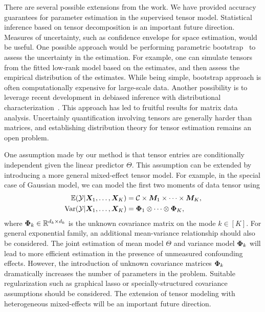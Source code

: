 \documentclass[12pt]{article}
\theoremstyle{definition}
\theoremstyle{definition}
\begin{document}
There are several possible extensions from the work. We have provided accuracy guarantees for parameter estimation in the supervised tensor model. Statistical inference based on tensor decomposition is an important future direction. Measures of uncertainty, such as confidence envelope for space estimation, would be useful. One possible approach would be performing parametric bootstrap~\citep{tibshirani1993introduction} to assess the uncertainty in the estimation. 
For example, one can simulate tensors from the fitted low-rank model based on the estimates, and then assess the empirical distribution of the estimates. 
While being simple, bootstrap approach is often computationally expensive for large-scale data. Another possibility is to leverage recent development in debiased inference with distributional characterization~\citep{chen2019inference,xia2019confidence}. This approach has led to fruitful results for matrix data analysis. Uncertainly quantification involving tensors are generally harder than matrices, and establishing distribution theory for tensor estimation remains an open problem.

One assumption made by our method is that tensor entries are conditionally independent given the linear predictor $\Theta$. This assumption can be extended by introducing a more general mixed-effect tensor model. For example, in the special case of Gaussian model, we can model the first two moments of data tensor using
\begin{align}\label{eq:extention}
\mathbb{E}(\mathcal{Y}|\bm X_1,\ldots,\bm X_K)&=\mathcal{C}\times\bm M_1\times \cdots \times \bm M_K,\\
 \text{Var}(\mathcal{Y}|\bm X_1,\ldots,\bm X_K)&=\bm{\Phi}_1\otimes \cdots \otimes \bm{\Phi}_K,
\end{align}
where $\bm{\Phi}_k\in\mathbb{R}^{d_k\times d_k}$ is the unknown covariance matrix on the mode $k\in[K]$. For general exponential family, an additional mean-variance relationship should also be considered. The joint estimation of mean model $\Theta$ and variance model $\bm{\Phi}_k$ will lead to more efficient estimation in the presence of unmeasured confounding effects. However, the introduction of unknown covariance matrices $\bm{\Phi}_k$ dramatically increases the number of parameters in the problem. Suitable regularization such as graphical lasso or specially-structured covariance assumptions should be considered. The extension of tensor modeling with heterogeneous mixed-effects will be an important future direction. 
\end{document}
